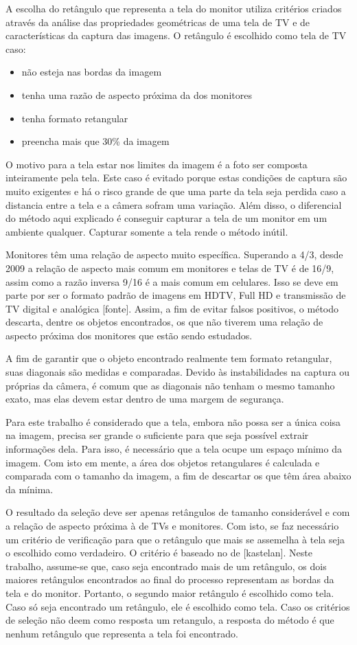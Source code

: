 A escolha do retângulo que representa a tela do monitor utiliza critérios criados através da análise das propriedades geométricas de uma tela de TV e de características da captura das imagens. O retângulo é escolhido como tela de TV caso:

\begin{itemize}
\item não esteja nas bordas da imagem
\item  tenha uma razão de aspecto próxima da dos monitores
\item tenha formato retangular
\item preencha mais que 30\% da imagem
\end{itemize}

O motivo para a tela estar nos limites da imagem é a foto ser composta inteiramente pela tela. Este caso é evitado porque estas condições de captura são muito exigentes e há o risco grande de que uma parte da tela seja perdida caso a distancia entre a tela e a câmera sofram uma variação. Além disso, o diferencial do método aqui explicado é conseguir capturar a tela de um monitor em um ambiente qualquer. Capturar somente a tela rende o método inútil.

Monitores têm uma relação de aspecto muito específica. Superando a 4/3, desde 2009 a relação de aspecto mais comum em monitores e telas de TV é de 16/9, assim como a razão inversa 9/16 é a mais comum em celulares. Isso se deve em parte por ser o formato padrão de imagens em HDTV, Full HD e transmissão de TV digital e analógica [fonte]. Assim, a fim de evitar falsos positivos, o método descarta, dentre os objetos encontrados, os que não tiverem uma relação de aspecto próxima dos monitores que estão sendo estudados.

A fim de garantir que o objeto encontrado realmente tem formato retangular, suas diagonais são medidas e comparadas. Devido às instabilidades na captura ou próprias da câmera, é comum que as diagonais não tenham o mesmo tamanho exato, mas elas devem estar dentro de uma margem de segurança.

Para este trabalho é considerado que a tela, embora não possa ser a única coisa na imagem, precisa ser grande o suficiente para que seja possível extrair informações dela. Para isso, é necessário que a tela ocupe um espaço mínimo da imagem. Com isto em mente, a área dos objetos retangulares é calculada e comparada com o tamanho da imagem, a fim de descartar os que têm área abaixo da mínima.

O resultado da seleção deve ser apenas retângulos de tamanho considerável e com a relação de aspecto próxima à de TVs e monitores. Com isto, se faz necessário um critério de verificação para que o retângulo que mais se assemelha à tela seja o escolhido como verdadeiro. O critério é baseado no de [kastelan]. Neste trabalho, assume-se que, caso seja encontrado mais de um retângulo, os dois maiores retângulos encontrados ao final do processo representam as bordas da tela e do monitor. Portanto, o segundo maior retângulo é escolhido como tela. Caso só seja encontrado um retângulo, ele é escolhido como tela. Caso os critérios de seleção não deem como resposta um retangulo, a resposta do método é que nenhum retângulo que representa a tela foi encontrado.

